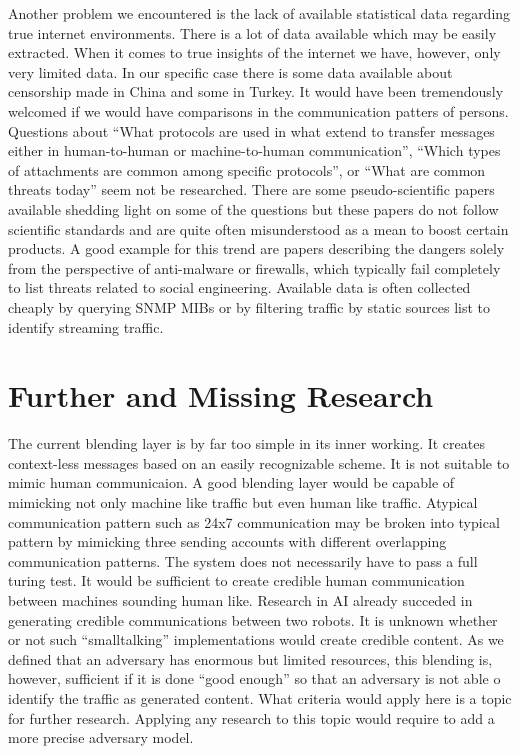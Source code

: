 Another problem we encountered is the lack of available statistical data regarding true internet environments. There is a lot of data available which may be easily extracted. When it comes to true insights of the internet we have, however, only very limited data. In our specific case there is some data available about censorship made in China and some in Turkey. It would have been tremendously welcomed if we would have comparisons in the communication patters of persons. Questions about ``What protocols are used in what extend to transfer messages either in human-to-human or machine-to-human communication'', ``Which types of attachments are common among specific protocols'', or ``What are common threats today'' seem not be researched. There are some pseudo-scientific papers available shedding light on some of the questions but these papers do not follow scientific standards and are quite often misunderstood as a mean to boost certain products. A good example for this trend are papers describing the dangers solely from the perspective of anti-malware or firewalls, which typically fail completely to list threats related to social engineering. Available data is often collected cheaply by querying SNMP MIBs or by filtering traffic by static sources list to identify streaming traffic.

\chapter{Further and Missing Research}
The current blending layer is by far too simple in its inner working. It creates context-less messages based on an easily recognizable scheme. It is not suitable to mimic human communicaion. A good blending layer would be capable of mimicking not only machine like traffic but even human like traffic. Atypical communication pattern such as 24x7 communication may be broken into typical pattern by mimicking three sending accounts with different overlapping communication patterns. The system does not necessarily have to pass a full turing test. It would be sufficient to create credible human communication between machines sounding human like. Research in AI already succeded in generating credible communications between two robots. It is unknown whether or not such ``smalltalking'' implementations would create credible content. As we defined that an adversary has enormous but limited resources, this blending is, however, sufficient if it is done ``good enough'' so that an adversary is not able o identify the traffic as generated content. What criteria would apply here is a topic for further research. Applying any research to this topic would require to add a more precise adversary model.

